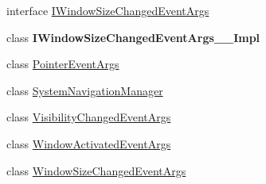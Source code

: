 \begin{DoxyCompactItemize}
\item 
interface \hyperlink{interface_windows_1_1_u_i_1_1_core_1_1_i_window_size_changed_event_args}{I\+Window\+Size\+Changed\+Event\+Args}
\item 
class {\bfseries I\+Window\+Size\+Changed\+Event\+Args\+\_\+\+\_\+\+Impl}
\item 
class \hyperlink{class_windows_1_1_u_i_1_1_core_1_1_pointer_event_args}{Pointer\+Event\+Args}
\item 
class \hyperlink{class_windows_1_1_u_i_1_1_core_1_1_system_navigation_manager}{System\+Navigation\+Manager}
\item 
class \hyperlink{class_windows_1_1_u_i_1_1_core_1_1_visibility_changed_event_args}{Visibility\+Changed\+Event\+Args}
\item 
class \hyperlink{class_windows_1_1_u_i_1_1_core_1_1_window_activated_event_args}{Window\+Activated\+Event\+Args}
\item 
class \hyperlink{class_windows_1_1_u_i_1_1_core_1_1_window_size_changed_event_args}{Window\+Size\+Changed\+Event\+Args}
\end{DoxyCompactItemize}

